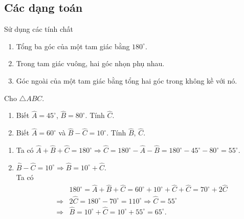 \subsection{Các dạng toán}
\begin{dang}
	Sử dụng các tính chất
	\begin{enumerate}[\tickEX]
		\item Tổng ba góc của một tam giác bằng $180^\circ$.
		\item Trong tam giác vuông, hai góc nhọn phụ nhau.
		\item Góc ngoài của một tam giác bằng tổng hai góc trong không kề với nó.
	\end{enumerate}
\end{dang}
\begin{vd}
	Cho $\triangle ABC$.
	\begin{enumerate}
		\item Biết $\widehat{A} = 45^\circ$, $\widehat{B} = 80^\circ$. Tính $\widehat{C}$.
		\item Biết $\widehat{A} = 60^\circ$ và $\widehat{B} - \widehat{C} = 10^\circ$. Tính $\widehat{B}$, $\widehat{C}$.
	\end{enumerate}
	\loigiai
	{
		\begin{enumerate}
			\item Ta có $\widehat{A} + \widehat{B} + \widehat{C} = 180^\circ \Rightarrow \widehat{C} = 180^\circ - \widehat{A} - \widehat{B} = 180^\circ - 45^\circ - 80^\circ = 55^\circ$.
			\item $\widehat{B} - \widehat{C} = 10^\circ \Rightarrow \widehat{B} = 10^\circ + \widehat{C}$.\\
			Ta có 
			{
				\allowdisplaybreaks	
				\begin{eqnarray*}
					&&180^\circ = \widehat{A} + \widehat{B} + \widehat{C} = 60^\circ + 10^\circ + \widehat{C} + \widehat{C} = 70^\circ + 2\widehat{C} \\
					&\Rightarrow& 2\widehat{C} = 180^\circ - 70^\circ = 110^\circ \Rightarrow \widehat{C} = 55^\circ\\
					&\Rightarrow& \widehat{B} = 10^\circ + \widehat{C} = 10^\circ + 55^\circ = 65^\circ.
				\end{eqnarray*}
			}
		\end{enumerate}
	}
\end{vd}

